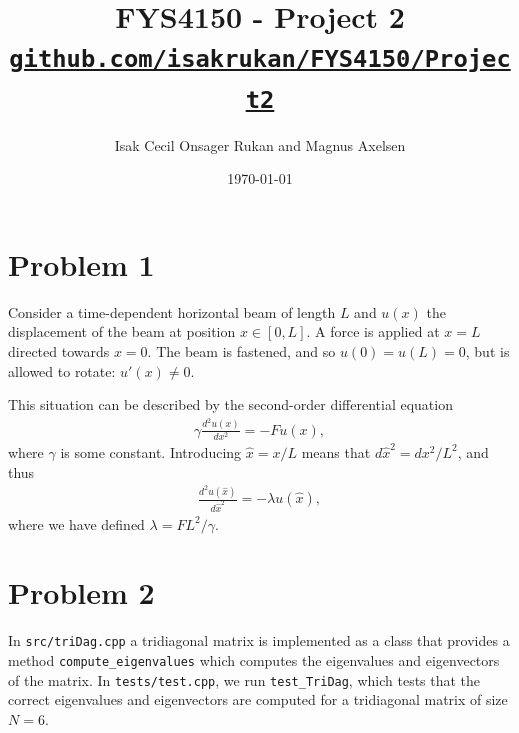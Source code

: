 \documentclass[english,notitlepage,reprint,nofootinbib]{revtex4-2}  %
\begin{document}
\title{FYS4150 - Project 2\\[0.5em]
  \small \href{https://github.com/isakrukan/FYS4150/tree/main/Project2}{\texttt{github.com/isakrukan/FYS4150/Project2}}
}
\author{Isak Cecil Onsager Rukan and Magnus Axelsen} %
\date{\today}                             %
\noaffiliation                            %
\maketitle

\section{Problem 1}
Consider a time-dependent horizontal beam of length \(L\) and \(u(x)\) the displacement of the beam at position \(x\in[0,L]\). A force is applied at \(x=L\) directed towards \(x=0\). The beam is fastened, and so \(u(0)=u(L)=0\), but is allowed to rotate: \(u'(x)\neq 0\).

This situation can be described by the second-order differential equation
\begin{align}
    \gamma \frac{d^2u(x)}{dx^2} = -Fu(x),
\end{align}
where \(\gamma\) is some constant. Introducing \(\hat{x}=x/L\) means that \(d\hat{x}^2 = dx^2/L^2\), and thus 
\begin{align}
    \frac{d^2u(\hat{x})}{d\hat{x}^2} 
    = -\lambda u(\hat{x}),
\end{align}
where we have defined \(\lambda = FL^2/\gamma\).

\section{Problem 2}
In \texttt{src/triDag.cpp} a tridiagonal matrix is implemented as a class that provides a method \texttt{compute\_eigenvalues} which computes the eigenvalues and eigenvectors of the matrix. In \texttt{tests/test.cpp}, we run \texttt{test\_TriDag}, which tests that the correct eigenvalues and eigenvectors are computed for a tridiagonal matrix of size \(N=6\).
\end{document}
